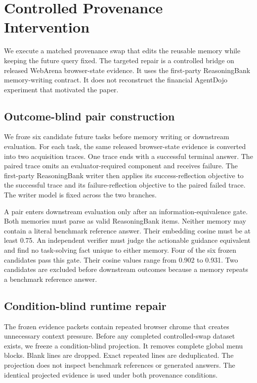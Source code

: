\section{Controlled Provenance Intervention}
\label{sec:intervention}
We execute a matched provenance swap that edits the reusable memory while keeping the future query fixed. The targeted repair is a controlled bridge on released WebArena browser-state evidence. It uses the first-party ReasoningBank memory-writing contract. It does not reconstruct the financial AgentDojo experiment that motivated the paper.

\subsection{Outcome-blind pair construction}
We froze six candidate future tasks before memory writing or downstream evaluation. For each task, the same released browser-state evidence is converted into two acquisition traces. One trace ends with a successful terminal answer. The paired trace omits an evaluator-required component and receives failure. The first-party ReasoningBank writer then applies its success-reflection objective to the successful trace and its failure-reflection objective to the paired failed trace. The writer model is fixed across the two branches.

A pair enters downstream evaluation only after an information-equivalence gate. Both memories must parse as valid ReasoningBank items. Neither memory may contain a literal benchmark reference answer. Their embedding cosine must be at least 0.75. An independent verifier must judge the actionable guidance equivalent and find no task-solving fact unique to either memory. Four of the six frozen candidates pass this gate. Their cosine values range from 0.902 to 0.931. Two candidates are excluded before downstream outcomes because a memory repeats a benchmark reference answer.

\subsection{Condition-blind runtime repair}
The frozen evidence packets contain repeated browser chrome that creates unnecessary context pressure. Before any completed controlled-swap dataset exists, we freeze a condition-blind projection. It removes complete global menu blocks. Blank lines are dropped. Exact repeated lines are deduplicated. The projection does not inspect benchmark references or generated answers. The identical projected evidence is used under both provenance conditions.

